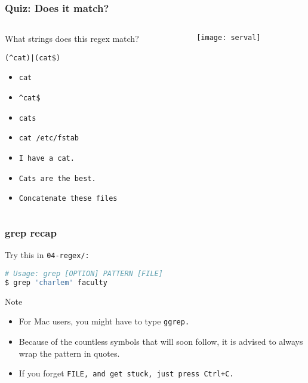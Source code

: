 \begin{frame}[fragile]
\frametitle{Quiz: Does it match?}
\begin{columns}
    \begin{column}{0.6\textwidth}
        What strings does this regex match? \newline

        \Large \verb!(^cat)|(cat$)! \normalsize

        \begin{itemize}
            \item \verb|cat|                      %
            \item \verb|^cat$|                    %
            \item \verb|cats|                     %
            \item \verb|cat /etc/fstab|           %
            \item \verb|I have a cat.|            %
            \item \verb|Cats are the best.|       %
            \item \verb|Concatenate these files|  %
        \end{itemize}
    \end{column}
    \begin{column}{0.4\textwidth}
        \texttt{[image: serval]}
    \end{column}
\end{columns}
\end{frame}

\begin{frame}[fragile]
\frametitle{grep recap}
Try this in \tt{04-regex/}:
\begin{lstlisting}[language=bash]
# Usage: grep [OPTION] PATTERN [FILE]
$ grep 'charlem' faculty
\end{lstlisting}
\begin{block}{Note}
    \begin{itemize}
        \item For Mac users, you might have to type \tt{ggrep}.
        \item Because of the countless symbols that will soon follow,
            it is advised to always wrap the pattern in quotes.
        \item If you forget \tt{FILE}, and get stuck, just press Ctrl+C.
    \end{itemize}
\end{block}
\end{frame}

